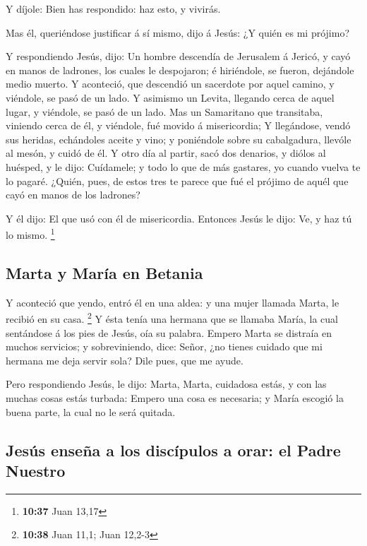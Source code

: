  Y díjole: Bien has respondido: haz esto, y vivirás.

 Mas él, queriéndose justificar á sí mismo, dijo á Jesús:
¿Y quién es mi prójimo?

 Y respondiendo Jesús, dijo: Un hombre descendía de
Jerusalem á Jericó, y cayó en manos de ladrones, los cuales le
despojaron; é hiriéndole, se fueron, dejándole medio muerto.
 Y aconteció, que descendió un sacerdote por aquel camino,
y viéndole, se pasó de un lado.  Y asimismo un Levita,
llegando cerca de aquel lugar, y viéndole, se pasó de un lado.
 Mas un Samaritano que transitaba, viniendo cerca de él, y
viéndole, fué movido á misericordia;  Y llegándose, vendó
sus heridas, echándoles aceite y vino; y poniéndole sobre su
cabalgadura, llevóle al mesón, y cuidó de él.  Y otro día
al partir, sacó dos denarios, y diólos al huésped, y le dijo: Cuídamele;
y todo lo que de más gastares, yo cuando vuelva te lo pagaré.
 ¿Quién, pues, de estos tres te parece que fué el prójimo
de aquél que cayó en manos de los ladrones?

 Y él dijo: El que usó con él de misericordia. Entonces
Jesús le dijo: Ve, y haz tú lo mismo. \footnote{\textbf{10:37} Juan
  13,17}

\hypertarget{marta-y-maruxeda-en-betania}{%
\subsection{Marta y María en
Betania}\label{marta-y-maruxeda-en-betania}}

 Y aconteció que yendo, entró él en una aldea: y una mujer
llamada Marta, le recibió en su casa. \footnote{\textbf{10:38} Juan
  11,1; Juan 12,2-3}  Y ésta tenía una hermana que se
llamaba María, la cual sentándose á los pies de Jesús, oía su palabra.
 Empero Marta se distraía en muchos servicios; y
sobreviniendo, dice: Señor, ¿no tienes cuidado que mi hermana me deja
servir sola? Dile pues, que me ayude.

 Pero respondiendo Jesús, le dijo: Marta, Marta, cuidadosa
estás, y con las muchas cosas estás turbada:  Empero una
cosa es necesaria; y María escogió la buena parte, la cual no le será
quitada.

\hypertarget{jesuxfas-enseuxf1a-a-los-discuxedpulos-a-orar-el-padre-nuestro}{%
\subsection{Jesús enseña a los discípulos a orar: el Padre
Nuestro}\label{jesuxfas-enseuxf1a-a-los-discuxedpulos-a-orar-el-padre-nuestro}}

